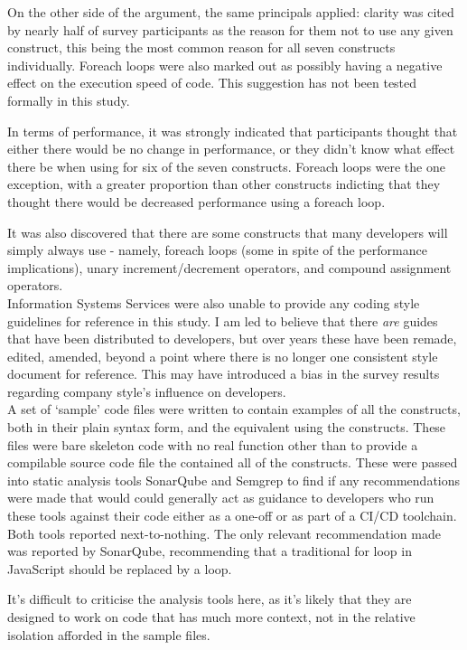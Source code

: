 \documentclass{article}
\begin{document}
            On the other side of the argument, the same principals applied: clarity was cited by nearly half of survey participants as the reason for them not to use any given construct, this being the most common reason for all seven constructs individually. Foreach loops were also marked out as possibly having a negative effect on the execution speed of code. This suggestion has not been tested formally in this study.

            In terms of performance, it was strongly indicated that participants thought that either there would be no change in performance, or they didn't know what effect there be when using for six of the seven constructs. Foreach loops were the one exception, with a greater proportion than other constructs indicting that they thought there would be decreased performance using a foreach loop.

            It was also discovered that there are some constructs that many developers will simply always use - namely, foreach loops (some in spite of the performance implications), unary increment/decrement operators, and compound assignment operators.
            \\
            Information Systems Services were also unable to provide any coding style guidelines for reference in this study. I am led to believe that there \emph{are} guides that have been distributed to developers, but over years these have been remade, edited, amended, beyond a point where there is no longer one consistent style document for reference. This may have introduced a bias in the survey results regarding company style's influence on developers.
            \\

            A set of `sample' code files were written to contain examples of all the constructs, both in their plain syntax form, and the equivalent using the constructs. These files were bare skeleton code with no real function other than to provide a compilable source code file the contained all of the constructs. These were passed into static analysis tools SonarQube and Semgrep to find if any recommendations were made that would could generally act as guidance to developers who run these tools against their code either as a one-off or as part of a CI/CD toolchain. Both tools reported next-to-nothing. The only relevant recommendation made was reported by SonarQube, recommending that a traditional for loop in JavaScript should be replaced by a  loop.

            It's difficult to criticise the analysis tools here, as it's likely that they are designed to work on code that has much more context, not in the relative isolation afforded in the sample files.
\end{document}
